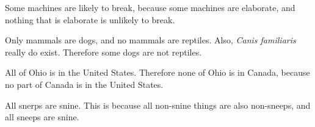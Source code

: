 \begin{exercises} 

\item Some machines are likely to break, because some machines are elaborate, and nothing that is elaborate is unlikely to break. 

 
\item Only mammals are dogs, and no mammals are reptiles. Also, \emph{Canis familiaris} really do exist. Therefore some dogs are not reptiles.




\item All of Ohio is in the United States. Therefore none of Ohio is in Canada, because no part of Canada is in the United States. 



\item All snerps are snine. This is because all non-snine things are also non-sneeps, and all sneeps are snine. 



\end{exercises}
